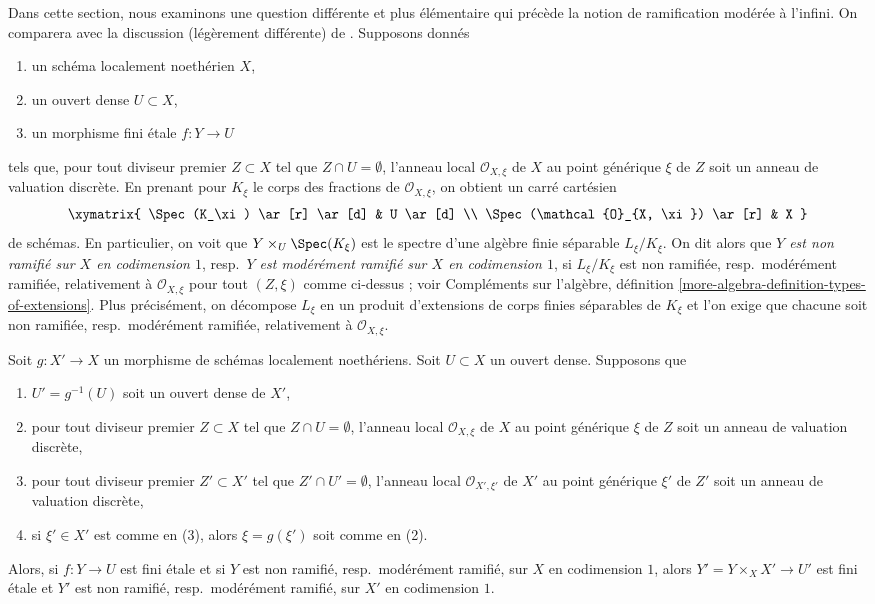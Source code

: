 \medskip\noindent
Dans cette section, nous examinons une question différente et plus élémentaire qui
précède la notion de ramification modérée à l'infini.
On comparera avec la discussion (légèrement différente)
de \cite{Grothendieck-Murre}.
Supposons donnés
\begin{enumerate}
\item un schéma localement noethérien $X$,
\item un ouvert dense $U \subset X$,
\item un morphisme fini \'etale $f : Y \to U$
\end{enumerate}
tels que, pour tout diviseur premier $Z \subset X$
tel que $Z \cap U = \emptyset$, l'anneau local $\mathcal{O}_{X, \xi}$
de $X$ au point générique $\xi$ de $Z$ soit un anneau de valuation discrète.
En prenant pour $K_\xi$ le corps des fractions de $\mathcal{O}_{X, \xi}$,
on obtient un carré cartésien
$$
\xymatrix{
\Spec(K_\xi) \ar[r] \ar[d] & U \ar[d] \\
\Spec(\mathcal{O}_{X, \xi}) \ar[r] & X
}
$$
de schémas. En particulier, on voit que $Y \times_U \Spec(K_\xi)$
est le spectre d'une algèbre finie séparable $L_\xi/K_\xi$.
On dit alors que
{\it $Y$ est non ramifié sur $X$ en codimension $1$},
resp.\ {\it $Y$ est modérément ramifié sur $X$ en codimension $1$},
si $L_\xi/K_\xi$ est non ramifiée, resp.\ modérément ramifiée,
relativement à $\mathcal{O}_{X, \xi}$ pour tout $(Z, \xi)$
comme ci-dessus ; voir Compléments sur l'algèbre, définition
\ref{more-algebra-definition-types-of-extensions}.
Plus précisément, on décompose $L_\xi$ en un produit d'extensions
de corps finies séparables de $K_\xi$ et l'on exige que chacune soit
non ramifiée, resp.\ modérément ramifiée, relativement à
$\mathcal{O}_{X, \xi}$.

\begin{lemma}
\label{lemma-pullback-tame-codim1}
Soit $g : X' \to X$ un morphisme de schémas localement noethériens.
Soit $U \subset X$ un ouvert dense. Supposons que
\begin{enumerate}
\item $U' = g^{-1}(U)$ soit un ouvert dense de $X'$,
\item pour tout diviseur premier $Z \subset X$ tel que $Z \cap U = \emptyset$,
l'anneau local $\mathcal{O}_{X, \xi}$ de $X$ au point générique $\xi$
de $Z$ soit un anneau de valuation discrète,
\item pour tout diviseur premier $Z' \subset X'$
tel que $Z' \cap U' = \emptyset$, l'anneau local $\mathcal{O}_{X', \xi'}$
de $X'$ au point générique $\xi'$ de $Z'$ soit un anneau de valuation discrète,
\item si $\xi' \in X'$ est comme en (3), alors $\xi = g(\xi')$ soit comme en (2).
\end{enumerate}
Alors, si $f : Y \to U$ est fini \'etale et si
$Y$ est non ramifié, resp.\ modérément ramifié, sur $X$
en codimension $1$, alors $Y' = Y \times_X X' \to U'$ est fini \'etale
et $Y'$ est non ramifié, resp.\ modérément ramifié, sur $X'$ en codimension $1$.
\end{lemma}


